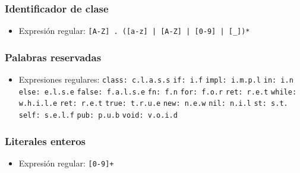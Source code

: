 
\subsubsection{Identificador de clase}
\begin{itemize}[leftmargin=*]
  \item Expresión regular: \verb~[A-Z] . ([a-z] | [A-Z] | [0-9] | [_])*~
\end{itemize}


\subsubsection{Palabras reservadas}
\begin{itemize}[leftmargin=*]
  \item Expresiones regulares:
  \subitem \verb~class: c.l.a.s.s~
  \subitem \verb~if: i.f~
  \subitem \verb~impl: i.m.p.l~
  \subitem \verb~in: i.n~
  \subitem \verb~else: e.l.s.e~
  \subitem \verb~false: f.a.l.s.e~
  \subitem \verb~fn: f.n~
  \subitem \verb~for: f.o.r~
  \subitem \verb~ret: r.e.t~
  \subitem \verb~while: w.h.i.l.e~
  \subitem \verb~ret: r.e.t~
  \subitem \verb~true: t.r.u.e~
  \subitem \verb~new: n.e.w~
  \subitem \verb~nil: n.i.l~
  \subitem \verb~st: s.t.~
  \subitem \verb~self: s.e.l.f~
  \subitem \verb~pub: p.u.b~
  \subitem \verb~void: v.o.i.d~
\end{itemize}


\subsubsection{Literales enteros}
\begin{itemize}[leftmargin=*]
  \item Expresión regular: \verb~[0-9]+~
\end{itemize}


